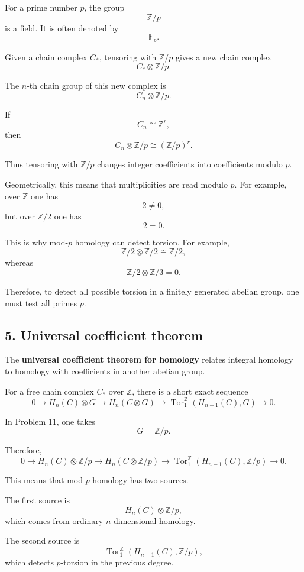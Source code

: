 \documentclass[12pt,a4paper]{article}
\theoremstyle{notespace}
\begin{document}
For a prime number \(p\), the group
\[
\mathbb Z/p
\]
is a field. It is often denoted by
\[
\mathbb F_p.
\]

Given a chain complex \(C_*\), tensoring with \(\mathbb Z/p\) gives a new chain complex
\[
C_*\otimes \mathbb Z/p.
\]

The \(n\)-th chain group of this new complex is
\[
C_n\otimes \mathbb Z/p.
\]

If
\[
C_n\cong \mathbb Z^r,
\]
then
\[
C_n\otimes \mathbb Z/p
\cong
(\mathbb Z/p)^r.
\]

Thus tensoring with \(\mathbb Z/p\) changes integer coefficients into coefficients modulo \(p\).

Geometrically, this means that multiplicities are read modulo \(p\). For example, over \(\mathbb Z\) one has
\[
2\neq 0,
\]
but over \(\mathbb Z/2\) one has
\[
2=0.
\]

This is why mod-\(p\) homology can detect torsion. For example,
\[
\mathbb Z/2\otimes \mathbb Z/2\cong \mathbb Z/2,
\]
whereas
\[
\mathbb Z/2\otimes \mathbb Z/3=0.
\]

Therefore, to detect all possible torsion in a finitely generated abelian group, one must test all primes \(p\).

\subsection*{5. Universal coefficient theorem}

The \textbf{universal coefficient theorem for homology} relates integral homology to homology with coefficients in another abelian group.

For a free chain complex \(C_*\) over \(\mathbb Z\), there is a short exact sequence
\[
0
\longrightarrow
H_n(C)\otimes G
\longrightarrow
H_n(C\otimes G)
\longrightarrow
\operatorname{Tor}_1^{\mathbb Z}(H_{n-1}(C),G)
\longrightarrow
0.
\]

In Problem 11, one takes
\[
G=\mathbb Z/p.
\]

Therefore,
\[
0
\longrightarrow
H_n(C)\otimes \mathbb Z/p
\longrightarrow
H_n(C\otimes \mathbb Z/p)
\longrightarrow
\operatorname{Tor}_1^{\mathbb Z}(H_{n-1}(C),\mathbb Z/p)
\longrightarrow
0.
\]

This means that mod-\(p\) homology has two sources.

The first source is
\[
H_n(C)\otimes \mathbb Z/p,
\]
which comes from ordinary \(n\)-dimensional homology.

The second source is
\[
\operatorname{Tor}_1^{\mathbb Z}(H_{n-1}(C),\mathbb Z/p),
\]
which detects \(p\)-torsion in the previous degree.
\end{document}
